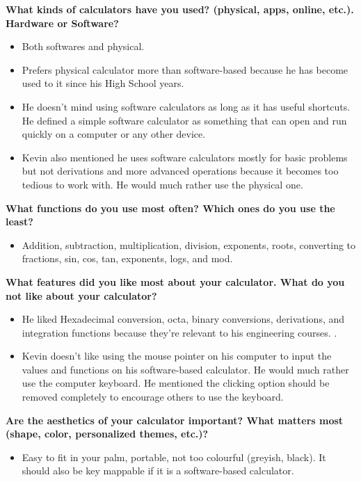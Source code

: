 \documentclass{article}
\begin{document}
\textbf{What kinds of calculators have you used? (physical, apps, online, etc.). Hardware or Software?}
\begin{itemize}
\itemsep0em 
\item Both softwares and physical.
\item Prefers physical calculator more than software-based because he has become used to it since his High School years. 
\item He doesn’t mind using software calculators as long as it has useful shortcuts. He defined a simple software calculator as something that can open and run quickly on a computer or any other device. 
\item Kevin also mentioned he uses software calculators mostly for basic problems but not derivations and more advanced operations because it becomes too tedious to work with. He would much rather use the physical one. 
\end{itemize}

\textbf{What functions do you use most often? Which ones do you use the least?}
\begin{itemize}
\itemsep0em 
\item Addition, subtraction, multiplication, division, exponents, roots, converting to fractions, sin, cos, tan, exponents, logs, and mod.
\end{itemize}

\textbf{What features did you like most about your calculator. What do you not like about your calculator?}
\begin{itemize}
\itemsep0em 
\item He liked Hexadecimal conversion, octa, binary conversions, derivations, and integration functions because they’re relevant to his engineering courses. .
\item Kevin doesn’t like using the mouse pointer on his computer to input the values and functions on his software-based calculator. He would much rather use the computer keyboard. He mentioned the clicking option should be removed completely to encourage others to use the keyboard. 
\end{itemize}

\textbf{Are the aesthetics of your calculator important? What matters most (shape, color,  personalized themes, etc.)?}
\begin{itemize}
\itemsep0em 
\item Easy to fit in your palm, portable, not too colourful (greyish, black). It should also be key mappable if it is a software-based calculator.
\end{itemize}
\end{document}
